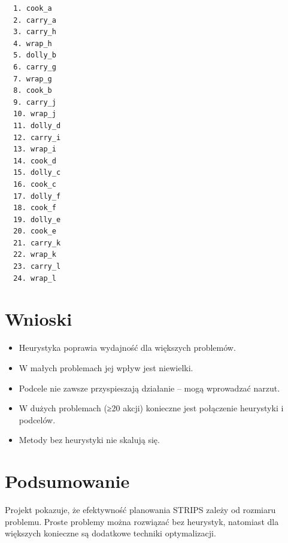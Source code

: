 \documentclass[a4paper,12pt]{article}
\begin{document}
\begin{verbatim}
  1. cook_a
  2. carry_a
  3. carry_h
  4. wrap_h
  5. dolly_b
  6. carry_g
  7. wrap_g
  8. cook_b
  9. carry_j
  10. wrap_j
  11. dolly_d
  12. carry_i
  13. wrap_i
  14. cook_d
  15. dolly_c
  16. cook_c
  17. dolly_f
  18. cook_f
  19. dolly_e
  20. cook_e
  21. carry_k
  22. wrap_k
  23. carry_l
  24. wrap_l
\end{verbatim}

\section{Wnioski}

\begin{itemize}
    \item Heurystyka poprawia wydajność dla większych problemów.
    \item W małych problemach jej wpływ jest niewielki.
    \item Podcele nie zawsze przyspieszają działanie – mogą wprowadzać narzut.
    \item W dużych problemach (≥20 akcji) konieczne jest połączenie heurystyki i podcelów.
    \item Metody bez heurystyki nie skalują się.
\end{itemize}

\section{Podsumowanie}

Projekt pokazuje, że efektywność planowania STRIPS zależy od rozmiaru problemu. Proste problemy można rozwiązać bez heurystyk, natomiast dla większych konieczne są dodatkowe techniki optymalizacji.
\end{document}
